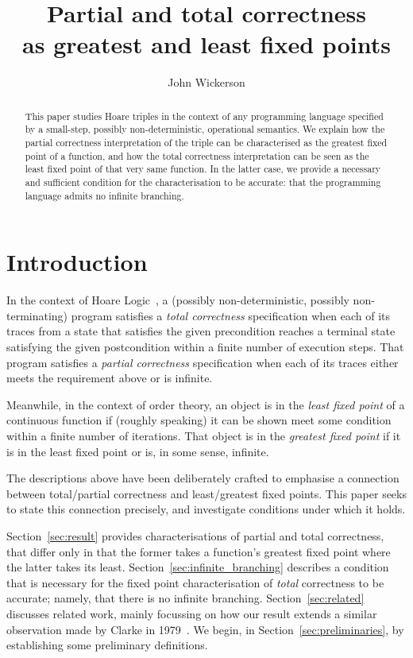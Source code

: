 \documentclass{llncs}
\title{Partial and total correctness \\ as greatest and least fixed points}
\author{John Wickerson}
\institute{Imperial College London}
\begin{document}
\maketitle

\thispagestyle{plain}
\pagestyle{plain}

\begin{abstract}
This paper studies Hoare triples in the context of any programming
language specified by a small-step, possibly non-deterministic,
operational semantics. We explain how the partial correctness
interpretation of the triple can be characterised as the greatest
fixed point of a function, and how the total correctness
interpretation can be seen as the least fixed point of that very same
function. In the latter case, we provide a necessary and sufficient
condition for the characterisation to be accurate: that the
programming language admits no infinite branching.
\end{abstract}

\section{Introduction}

In the context of Hoare Logic~\cite{hoare69}, a (possibly
non-deterministic, possibly non-terminating) program satisfies a
\emph{total correctness} specification when each of its traces from a
state that satisfies the given precondition reaches a terminal state
satisfying the given postcondition within a finite number of execution
steps. That program satisfies a \emph{partial correctness}
specification when each of its traces either meets the requirement
above or is infinite. 

Meanwhile, in the context of order theory, an
object is in the \emph{least fixed point} of a continuous function if
(roughly speaking) it can be shown meet some condition within a finite
number of iterations. That object is in the \emph{greatest fixed
point} if it is in the least fixed point or is, in some sense,
infinite.

The descriptions above have been deliberately crafted to emphasise a
connection between total/partial correctness and least/greatest fixed
points. This paper seeks to state this connection precisely, and
investigate conditions under which it holds.

Section~\ref{sec:result} provides characterisations of partial and
total correctness, that differ only in that the former takes a
function's greatest fixed point where the latter takes its least.
Section~\ref{sec:infinite_branching} describes a condition that is
necessary for the fixed point characterisation of \emph{total}
correctness to be accurate; namely, that there is no infinite
branching. Section~\ref{sec:related} discusses related work, mainly
focussing on how our result extends a similar observation made by
Clarke in 1979~\cite{clarke79}. We begin, in
Section~\ref{sec:preliminaries}, by establishing some preliminary
definitions.
\end{document}

